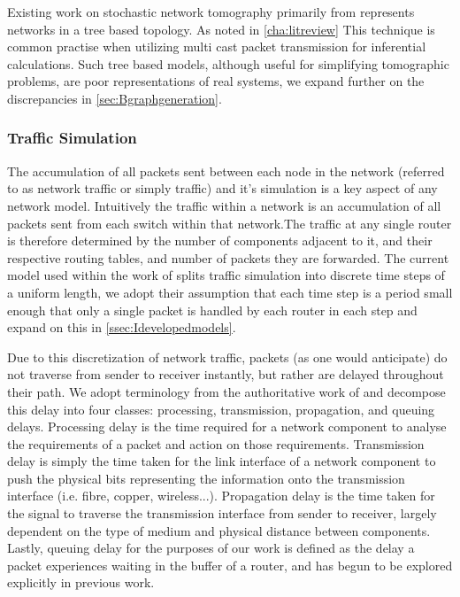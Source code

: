 Existing work on stochastic network tomography primarily from \cite{thoppe_stochastic_2014} \cite{kolar_distributed_2020} represents networks in a tree based topology. As noted in \cref{cha:litreview} This technique is common practise when utilizing multi cast packet transmission for inferential calculations. Such tree based models, although useful for simplifying tomographic problems, are poor representations of real systems, we expand further on the discrepancies in \cref{sec:Bgraphgeneration}.

\subsubsection*{Traffic Simulation}
\label{sssec:Itrafficsimulation}

The accumulation of all packets sent between each node in the network (referred to as network traffic or simply traffic) and it’s simulation is a key aspect of any network model. Intuitively the traffic within a network is an accumulation of all packets sent from each switch within that network.The traffic at any single router is therefore determined by the number of components adjacent to it, and their respective routing tables, and number of packets they are forwarded. The current model used within the work of \cite{barnes_stochastic_2020} splits traffic simulation into discrete time steps of a uniform length, we adopt their assumption that each time step is a period small enough that only a single packet is handled by each router in each step and expand on this in \cref{ssec:Idevelopedmodels}. \par
Due to this discretization of network traffic, packets (as one would anticipate) do not traverse from sender to receiver instantly, but rather are delayed throughout their path. We adopt terminology from the authoritative work of \cite{kurose_computer_2013} and decompose this delay into four classes: processing, transmission, propagation, and queuing delays. Processing delay is the time required for a network component to analyse the requirements of a packet and action on those requirements. Transmission delay is simply the time taken for the link interface of a network component to push the physical bits representing the information onto the transmission interface (i.e. fibre, copper, wireless...). Propagation delay is the time taken for the signal to traverse the transmission interface from sender to receiver, largely dependent on the type of medium and physical distance between components. Lastly, queuing delay for the purposes of our work is defined as the delay a packet experiences waiting in the buffer of a router, and has begun to be explored explicitly in previous work.\par
